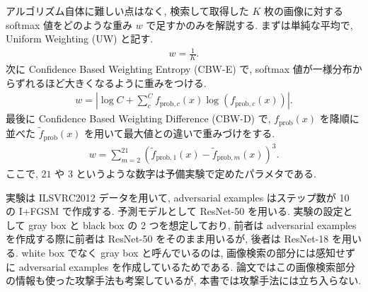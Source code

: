 アルゴリズム自体に難しい点はなく, 検索して取得した $K$ 枚の画像に対する softmax 値をどのような重み $w$ で足すかのみを解説する.
まずは単純な平均で, Uniform Weighting (UW) と記す.
%
\begin{eqnarray}
w = \frac{1}{K}.
\label{eq:defense-against-adversarial-uw}
\end{eqnarray}
%
次に Confidence Based Weighting Entropy (CBW-E) で, softmax 値が一様分布からずれるほど大きくなるように重みをつける.
%
\begin{eqnarray}
w = \left| \log C + \sum_c^C f_{\text{prob}, c} (x) \log \left( f_{\text{prob}, c} (x) \right) \right|.
\label{eq:defense-against-adversarial-cbwe}
\end{eqnarray}
%
最後に Confidence Based Weighting Difference (CBW-D) で, $f_{\text{prob}} (x)$ を降順に並べた $\tilde{f}_{\text{prob}} (x)$ を用いて最大値との違いで重みづけをする.
%
\begin{eqnarray}
w = \sum_{m = 2}^{21} ( \tilde{f}_{\text{prob}, 1} (x) - \tilde{f}_{\text{prob}, m} (x) )^3.
\label{eq:defense-against-adversarial-cbwd}
\end{eqnarray}
%
ここで, $21$ や $3$ というような数字は予備実験で定めたパラメタである.

実験は ILSVRC2012 データを用いて, adversarial examples はステップ数が 10 の I+FGSM で作成する.
予測モデルとして ResNet-50 を用いる.
実験の設定として gray box と black box の 2 つを想定しており, 前者は adversarial examples を作成する際に前者は ResNet-50 をそのまま用いるが, 後者は ResNet-18 を用いる.
white box でなく gray box と呼んでいるのは, 画像検索の部分には感知せずに adversarial examples を作成しているためである.
論文ではこの画像検索部分の情報も使った攻撃手法も考案しているが, 本書では攻撃手法には立ち入らない.

